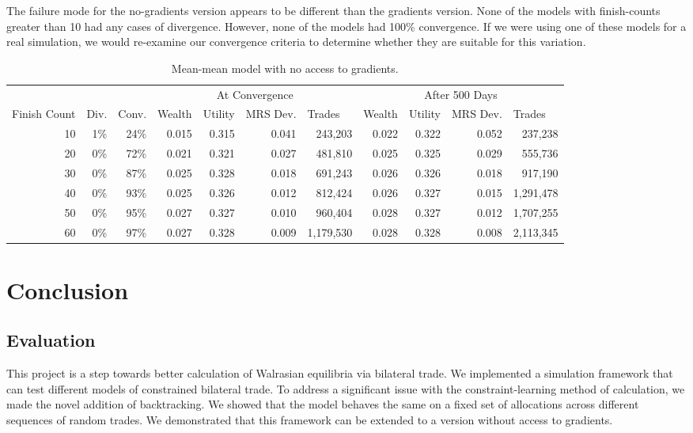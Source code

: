 \documentclass[12pt,a4paper,titlepage]{article}
\newcommand{\co}[1]{\textsf{#1}}
\begin{document}
The failure mode for the no-gradients version appears to be different than the gradients version.
None of the models with finish-counts greater than 10 had any cases of divergence.
However, none of the models had 100\% convergence.
If we were using one of these models for a real simulation, we would re-examine our convergence criteria to determine whether they are suitable for this variation.

\begin{table}
  \begin{tabular}{r|rr|rrrr|rrrr}
    
    & \multicolumn{1}{|l}{} & \multicolumn{1}{l}{} & \multicolumn{ 4}{|c|}{At Convergence} & \multicolumn{ 4}{c}{After 500 Days} \\ 
    Finish Count & \multicolumn{1}{|l}{Div.} & \multicolumn{1}{l}{Conv.} & \multicolumn{1}{|l}{Wealth} & \multicolumn{1}{l}{Utility} & \multicolumn{1}{l}{MRS Dev.} & \multicolumn{1}{l}{Trades} & \multicolumn{1}{|l}{Wealth} & \multicolumn{1}{l}{Utility} & \multicolumn{1}{l}{MRS Dev.} & \multicolumn{1}{l}{Trades} \\ 
    \hline
    10 & 1\% & 24\% & 0.015 & 0.315 & 0.041 & 243,203   & 0.022 & 0.322 & 0.052 & 237,238 \\
    20 & 0\% & 72\% & 0.021 & 0.321 & 0.027 & 481,810   & 0.025 & 0.325 & 0.029 & 555,736 \\
    30 & 0\% & 87\% & 0.025 & 0.328 & 0.018 & 691,243   & 0.026 & 0.326 & 0.018 & 917,190 \\
    40 & 0\% & 93\% & 0.025 & 0.326 & 0.012 & 812,424   & 0.026 & 0.327 & 0.015 & 1,291,478 \\
    50 & 0\% & 95\% & 0.027 & 0.327 & 0.010 & 960,404   & 0.028 & 0.327 & 0.012 & 1,707,255 \\
    60 & 0\% & 97\% & 0.027 & 0.328 & 0.009 & 1,179,530 & 0.028 & 0.328 & 0.008 & 2,113,345 \\
  \end{tabular}
  \caption{\co{Mean}-\co{mean} model with no access to gradients.}
  \label{tab:ut}
\end{table}

\clearpage

\section{Conclusion}\label{conclusion}

\subsection{Evaluation}
This project is a step towards better calculation of Walrasian equilibria via bilateral trade.
We implemented a simulation framework that can test different models of constrained bilateral trade.
To address a significant issue with the constraint-learning method of calculation, we made the novel addition of backtracking.
We showed that the model behaves the same on a fixed set of allocations across different sequences of random trades.
We demonstrated that this framework can be extended to a version without access to gradients.
\end{document}
